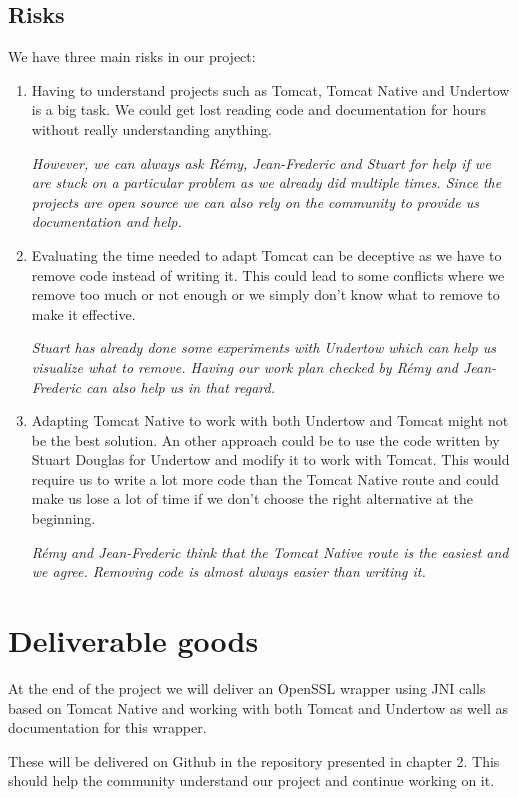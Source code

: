 \documentclass[11pt,a4paper,bibliography=totocnumbered]{scrartcl}
\begin{document}
\subsection{Risks}
\label{subsec:risks}
We have three main risks in our project:
\begin{enumerate}
\item Having to understand projects such as Tomcat, Tomcat Native and Undertow is a big task. We could get lost reading code and documentation for hours without really understanding anything.

\textit{However, we can always ask Rémy, Jean-Frederic and Stuart for help if we are stuck on a particular problem as we already did multiple times. Since the projects are open source we can also rely on the community to provide us documentation and help.}

\item Evaluating the time needed to adapt Tomcat can be deceptive as we have to remove code instead of writing it. This could lead to some conflicts where we remove too much or not enough or we simply don't know what to remove to make it effective.

\textit{Stuart has already done some experiments with Undertow which can help us visualize what to remove. Having our work plan checked by Rémy and Jean-Frederic can also help us in that regard.}
\item Adapting Tomcat Native to work with both Undertow and Tomcat might not be the best solution. An other approach could be to use the code written by Stuart Douglas for Undertow and modify it to work with Tomcat. This would require us to write a lot more code than the Tomcat Native route and could make us lose a lot of time if we don't choose the right alternative at the beginning.

\textit{Rémy and Jean-Frederic think that the Tomcat Native route is the easiest and we agree. Removing code is almost always easier than writing it.}
\end{enumerate}


\section{Deliverable goods}

At the end of the project we will deliver an OpenSSL wrapper using JNI calls based on Tomcat Native and working with both Tomcat and Undertow as well as documentation for this wrapper.

These will be delivered on Github in the repository presented in chapter 2. This should help the community understand our project and continue working on it.
\end{document}
